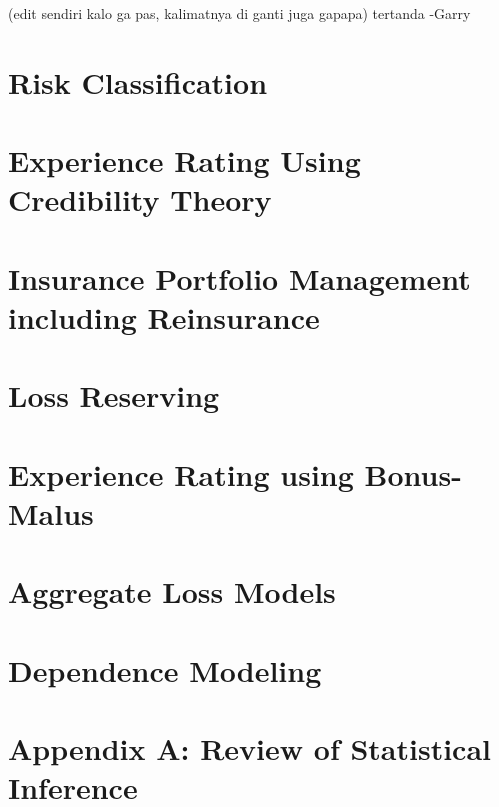 \documentclass[
]{book}
\begin{document}
(edit sendiri kalo ga pas, kalimatnya di ganti juga gapapa)
tertanda -Garry

\hypertarget{risk-classification}{%
\chapter{Risk Classification}\label{risk-classification}}

\hypertarget{experience-rating-using-credibility-theory}{%
\chapter{Experience Rating Using Credibility Theory}\label{experience-rating-using-credibility-theory}}

\hypertarget{insurance-portfolio-management-including-reinsurance}{%
\chapter{Insurance Portfolio Management including Reinsurance}\label{insurance-portfolio-management-including-reinsurance}}

\hypertarget{loss-reserving}{%
\chapter{Loss Reserving}\label{loss-reserving}}

\hypertarget{experience-rating-using-bonus-malus}{%
\chapter{Experience Rating using Bonus-Malus}\label{experience-rating-using-bonus-malus}}

\hypertarget{aggregate-loss-models-1}{%
\chapter{Aggregate Loss Models}\label{aggregate-loss-models-1}}

\hypertarget{dependence-modeling}{%
\chapter{Dependence Modeling}\label{dependence-modeling}}

\hypertarget{appendix-a-review-of-statistical-inference}{%
\chapter{Appendix A: Review of Statistical Inference}\label{appendix-a-review-of-statistical-inference}}
\end{document}
